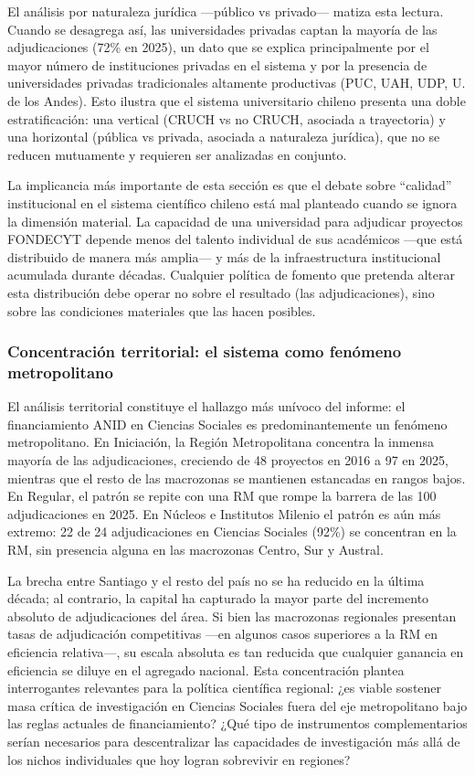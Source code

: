 \documentclass[
  12pt,
  letterpaper,
]{article}
\begin{document}
El análisis por naturaleza jurídica ---público vs privado--- matiza esta
lectura. Cuando se desagrega así, las universidades privadas captan la
mayoría de las adjudicaciones (72\% en 2025), un dato que se explica
principalmente por el mayor número de instituciones privadas en el
sistema y por la presencia de universidades privadas tradicionales
altamente productivas (PUC, UAH, UDP, U. de los Andes). Esto ilustra que
el sistema universitario chileno presenta una doble estratificación: una
vertical (CRUCH vs no CRUCH, asociada a trayectoria) y una horizontal
(pública vs privada, asociada a naturaleza jurídica), que no se reducen
mutuamente y requieren ser analizadas en conjunto.

La implicancia más importante de esta sección es que el debate sobre
``calidad'' institucional en el sistema científico chileno está mal
planteado cuando se ignora la dimensión material. La capacidad de una
universidad para adjudicar proyectos FONDECYT depende menos del talento
individual de sus académicos ---que está distribuido de manera más
amplia--- y más de la infraestructura institucional acumulada durante
décadas. Cualquier política de fomento que pretenda alterar esta
distribución debe operar no sobre el resultado (las adjudicaciones),
sino sobre las condiciones materiales que las hacen posibles.

\subsubsection{Concentración territorial: el sistema como fenómeno
metropolitano}\label{concentraciuxf3n-territorial-el-sistema-como-fenuxf3meno-metropolitano}

El análisis territorial constituye el hallazgo más unívoco del informe:
el financiamiento ANID en Ciencias Sociales es predominantemente un
fenómeno metropolitano. En Iniciación, la Región Metropolitana concentra
la inmensa mayoría de las adjudicaciones, creciendo de 48 proyectos en
2016 a 97 en 2025, mientras que el resto de las macrozonas se mantienen
estancadas en rangos bajos. En Regular, el patrón se repite con una RM
que rompe la barrera de las 100 adjudicaciones en 2025. En Núcleos e
Institutos Milenio el patrón es aún más extremo: 22 de 24 adjudicaciones
en Ciencias Sociales (92\%) se concentran en la RM, sin presencia alguna
en las macrozonas Centro, Sur y Austral.

La brecha entre Santiago y el resto del país no se ha reducido en la
última década; al contrario, la capital ha capturado la mayor parte del
incremento absoluto de adjudicaciones del área. Si bien las macrozonas
regionales presentan tasas de adjudicación competitivas ---en algunos
casos superiores a la RM en eficiencia relativa---, su escala absoluta
es tan reducida que cualquier ganancia en eficiencia se diluye en el
agregado nacional. Esta concentración plantea interrogantes relevantes
para la política científica regional: ¿es viable sostener masa crítica
de investigación en Ciencias Sociales fuera del eje metropolitano bajo
las reglas actuales de financiamiento? ¿Qué tipo de instrumentos
complementarios serían necesarios para descentralizar las capacidades de
investigación más allá de los nichos individuales que hoy logran
sobrevivir en regiones?
\end{document}
